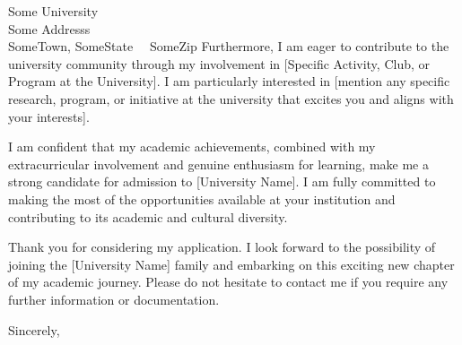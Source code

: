 \documentclass[12pt]{CQMUletter}
\begin{document}
\begin{letter}{
               Some University\\ 
               Some Addresss\\ 
               SomeTown, SomeState 					       				  		 ~~SomeZip
               }
Furthermore, I am eager to contribute to the university community through my involvement in [Specific Activity, Club, or Program at the University]. I am particularly interested in [mention any specific research, program, or initiative at the university that excites you and aligns with your interests].

I am confident that my academic achievements, combined with my extracurricular involvement and genuine enthusiasm for learning, make me a strong candidate for admission to [University Name]. I am fully committed to making the most of the opportunities available at your institution and contributing to its academic and cultural diversity.

Thank you for considering my application. I look forward to the possibility of joining the [University Name] family and embarking on this exciting new chapter of my academic journey. Please do not hesitate to contact me if you require any further information or documentation.
\closing{Sincerely,}




\end{letter}
\end{document}
